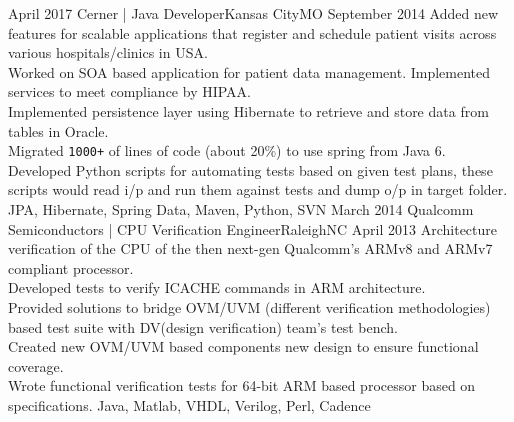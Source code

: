 \begin{experiences}
  \experience
    {April 2017} 
    	{Cerner | Java Developer}{Kansas City}{MO} %
    {September 2014} {
                      		\textbullet \thinspace Added new features for scalable applications that register and schedule patient visits across various hospitals/clinics in USA. \\
		 		 \textbullet \thinspace Worked on SOA based application for patient data management. Implemented services to meet compliance by HIPAA. \\
				 \textbullet \thinspace Implemented persistence layer using Hibernate to retrieve and store data from tables in Oracle. \\
				 \textbullet \thinspace Migrated \texttt{1000+} of lines of code (about 20\%) to use spring from Java 6. \\ 
				 \textbullet \thinspace Developed Python scripts for automating tests based on given test plans, these scripts would read i/p and run them against tests and dump o/p in target folder.	 
		                 }
		                  {JPA, Hibernate, Spring Data, Maven, Python, SVN } %
  \emptySeparator
  \experience
    {March 2014}  
    	{Qualcomm Semiconductors  | CPU Verification Engineer}{Raleigh}{NC} %
    {April 2013} {
        		\textbullet \thinspace	Architecture verification of the CPU of the then next-gen Qualcomm's ARMv8 and ARMv7 compliant processor. \\
			 \textbullet \thinspace Developed tests to verify ICACHE commands in ARM architecture. \\
		 \textbullet \thinspace Provided solutions to bridge OVM/UVM (different verification methodologies) based test suite with DV(design verification) team's test bench.\\
		 \textbullet \thinspace Created new OVM/UVM based components new design to ensure functional coverage. \\
		 \textbullet \thinspace Wrote functional verification tests for 64-bit ARM based processor based on specifications.
		       }
		      {Java, Matlab, VHDL, Verilog, Perl, Cadence} %
\end{experiences}
